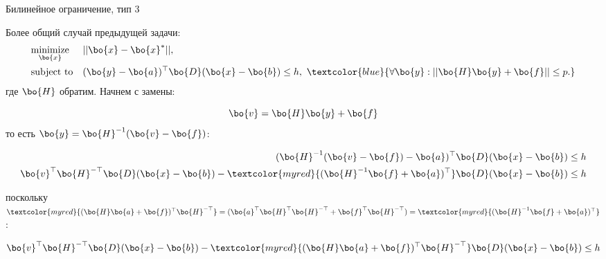 \documentclass{beamer}
\begin{document}
\begin{frame}{Билинейное ограничение, тип 3}
	\begin{flushleft}
		
		Более общий случай предыдущей задачи:
		\begin{equation}
			\begin{aligned}
				& \underset{\bo{x}}{\text{minimize}} 
				& & ||\bo{x} - \bo{x}^*||, \\
				& \text{subject to}
				& & (\bo{y} - \bo{a})^\top \bo{D} (\bo{x} - \bo{b}) \leq h, \ 
				\textcolor{blue}{
					\forall \bo{y} : ||\bo{H}\bo{y} + \bo{f}|| \leq p.} 
			\end{aligned}
		\end{equation}
		где $\bo{H}$ обратим. Начнем с замены:
		
		\begin{equation}
			\bo{v} = \bo{H}\bo{y} + \bo{f}
		\end{equation}
		то есть $\bo{y} = \bo{H}^{-1}(\bo{v} -\bo{f})$:
		
		\begin{align}
			(\bo{H}^{-1}(\bo{v} -\bo{f}) - \bo{a})^\top \bo{D} (\bo{x} - \bo{b}) \leq h \\
			\bo{v}^\top \bo{H}^{-\top} \bo{D} (\bo{x} - \bo{b}) - \textcolor{myred}{(\bo{H}^{-1}\bo{f} + \bo{a})^\top} \bo{D} (\bo{x} - \bo{b}) \leq h
		\end{align}
		
		{\small
			поскольку $\textcolor{myred}{(\bo{H}\bo{a} + \bo{f})^\top \bo{H}^{-\top}} = (\bo{a}^\top\bo{H}^\top \bo{H}^{-\top}   + \bo{f}^\top \bo{H}^{-\top})  = \textcolor{myred}{(\bo{H}^{-1}\bo{f} + \bo{a})^\top}$:}
		
		\begin{align}
			\bo{v}^\top \bo{H}^{-\top} \bo{D} (\bo{x} - \bo{b}) - \textcolor{myred}{(\bo{H}\bo{a} + \bo{f})^\top \bo{H}^{-\top}}\bo{D} (\bo{x} - \bo{b}) \leq h
		\end{align}
		
		
	\end{flushleft}
\end{frame}
\end{document}

